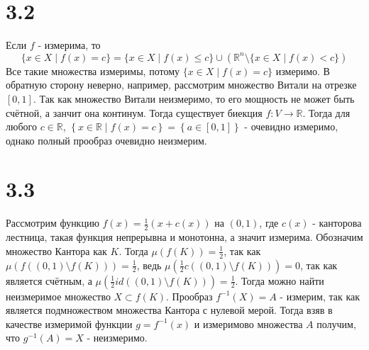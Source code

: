 \documentclass[12pt]{article}
\begin{document}
\section{3.2}
Если $f$ - измерима, то 
\[
    \{x \in X \mid f(x) = c\} = \{x \in X \mid f(x) \leq c\} \cup \left( \mathbb{R}^n \setminus \{x \in X \mid f(x) < c\} \right) 
\]  
Все такие множества измеримы, потому $\{x \in X \mid f(x) = c\}$ измеримо. 
В обратную сторону неверно, например, рассмотрим множество Витали на отрезке $[0, 1]$. Так как 
множество Витали неизмеримо, то его мощность не может быть счётной, а занчит она континум. 
Тогда существует биекция $f:V \to \mathbb{R}$. Тогда для любого $c \in \mathbb{R}$, 
$\left\{ x \in \mathbb{R} \mid f(x) = c\right\} = \left\{ a \in [0, 1] \right\}$ - очевидно измеримо, 
однако полный прообраз очевидно неизмерим. 
\section{3.3}
Рассмотрим функцию $f(x) = \frac{1}{2} (x + c(x))$ на $(0, 1)$, где $c(x)$ - канторова лестница, такая функция 
непрерывна и монотонна, а значит измерима. Обозначим 
множество Кантора как $K$. Тогда $\mu (f(K)) = \frac{1}{2}$, так как $\mu(f((0, 1) \setminus f(K))) = \frac{1}{2}$, ведь 
$\mu(\frac{1}{2}c((0, 1) \setminus f(K))) = 0$, так как является счётным, а $\mu(\frac{1}{2}id((0, 1) \setminus f(K))) = \frac{1}{2}$. 
Тогда можно найти неизмеримое множество $X \subset f(K)$. 
Прообраз $f^{-1}(X) = A$ - измерим, так как является подмножеством множества Кантора с нулевой мерой. 
Тогда взяв в качестве измеримой функции $g = f^{-1}(x)$ и измеримово множества $A$ получим, что 
$g^{-1}(A) = X$ - неизмеримо.
\end{document}
